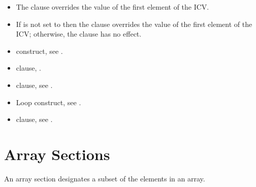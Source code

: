 \linenumbers

\descr
\begin{itemize}
\item The  clause overrides the value of the first element of the
 ICV.

\item If  is not set to  then the  clause overrides the value of the
first element of the  ICV; otherwise, the  clause has no effect.
\end{itemize}

\crossreferences
\begin{itemize}
\item {} construct, see
.

\item {} clause,
.

\item {} clause, see
.

\item Loop construct, see
.

\item {} clause, see
.
\end{itemize}










\section{Array Sections}
\label{sec:Array Sections}
An array section designates a subset of the elements in an array.


